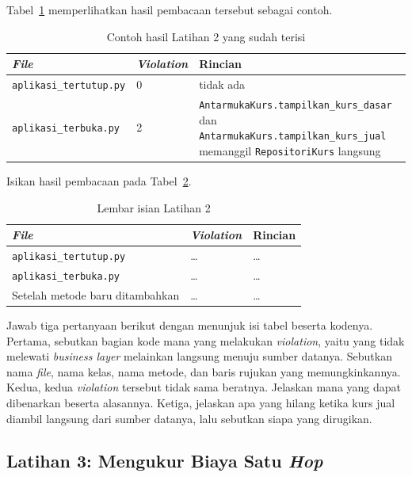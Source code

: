 Tabel~\ref{tab:lat2-contoh} memperlihatkan hasil pembacaan tersebut sebagai
contoh.

\begin{table}[htbp]
  \centering
  \caption{Contoh hasil Latihan 2 yang sudah terisi}
  \label{tab:lat2-contoh}
  \begin{tabularx}{\textwidth}{|l|l|X|}
    \hline
    \textbf{\textit{File}} & \textbf{\textit{Violation}} & \textbf{Rincian} \\
    \hline
    \texttt{aplikasi\_tertutup.py} & 0 & tidak ada \\
    \hline
    \texttt{aplikasi\_terbuka.py} & 2 & \texttt{AntarmukaKurs.tampilkan\_kurs\_dasar} dan \texttt{AntarmukaKurs.tampilkan\_kurs\_jual} memanggil \texttt{RepositoriKurs} langsung \\
    \hline
  \end{tabularx}
\end{table}

Isikan hasil pembacaan pada Tabel~\ref{tab:lat2-hasil}.

\begin{table}[htbp]
  \centering
  \caption{Lembar isian Latihan 2}
  \label{tab:lat2-hasil}
  \begin{tabularx}{\textwidth}{|l|l|X|}
    \hline
    \textbf{\textit{File}} & \textbf{\textit{Violation}} & \textbf{Rincian} \\
    \hline
    \texttt{aplikasi\_tertutup.py} & \dots & \dots \\
    \hline
    \texttt{aplikasi\_terbuka.py} & \dots & \dots \\
    \hline
    Setelah metode baru ditambahkan & \dots & \dots \\
    \hline
  \end{tabularx}
\end{table}

Jawab tiga pertanyaan berikut dengan menunjuk isi tabel beserta kodenya.
Pertama, sebutkan bagian kode mana yang melakukan \textit{violation}, yaitu
yang tidak melewati \textit{business layer} melainkan langsung menuju sumber
datanya. Sebutkan nama \textit{file}, nama kelas, nama metode, dan baris rujukan yang
memungkinkannya. Kedua, kedua \textit{violation} tersebut tidak sama beratnya. Jelaskan
mana yang dapat dibenarkan beserta alasannya. Ketiga,
jelaskan apa yang hilang ketika kurs jual diambil langsung dari sumber datanya,
lalu sebutkan siapa yang dirugikan.

\subsection*{Latihan 3: Mengukur Biaya Satu \textit{Hop}}

